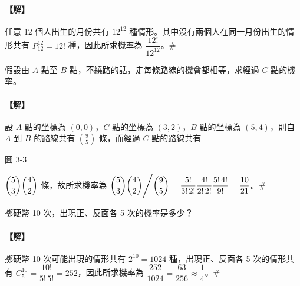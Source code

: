 \paragraph{【解】}
任意 12 個人出生的月份共有 $12^{12}$ 種情形。其中沒有兩個人在同一月份出生的情形共有 $P_{12}^{12} = 12!$ 種，因此所求機率為 $\dfrac{12!}{12^{12}}$。\hfill\#

\vspace{1em}
\noindent
\begin{minipage}[c]{0.58\textwidth}
\begin{example}\label{ex:b5-3-6}
假設由 $A$ 點至 $B$ 點，不繞路的話，走每條路線的機會都相等，求經過 $C$ 點的機率。
\end{example}
\paragraph{【解】}
設 $A$ 點的坐標為 $(0, 0)$，$C$ 點的坐標為 $(3, 2)$，$B$ 點的坐標為 $(5, 4)$，則自 $A$ 到 $B$ 的路線共有 $\binom{9}{5}$ 條，而經過 $C$ 點的路線共有
\end{minipage}\hfill
\begin{minipage}[c]{0.38\textwidth}
\centering
{}
\par\vspace{0.3em}
{\small 圖 3-3}
\end{minipage}

\vspace{0.4em}
\noindent
$\dbinom{5}{3}\dbinom{4}{2}$ 條，故所求機率為 $\dbinom{5}{3}\dbinom{4}{2} \Bigg/ \dbinom{9}{5} = \dfrac{5!}{3!\,2!} \dfrac{4!}{2!\,2!} \dfrac{5!\,4!}{9!} = \dfrac{10}{21}$。\hfill\#

\vspace{1em}
\begin{example}[重複試驗]\label{ex:b5-3-7}
擲硬幣 10 次，出現正、反面各 5 次的機率是多少？
\end{example}
\paragraph{【解】}
擲硬幣 10 次可能出現的情形共有 $2^{10} = 1024$ 種，出現正、反面各 5 次的情形共有 $C_5^{10} = \dfrac{10!}{5!\,5!} = 252$，因此所求機率為 $\dfrac{252}{1024} = \dfrac{63}{256} \approx \dfrac{1}{4}$。\hfill\#

